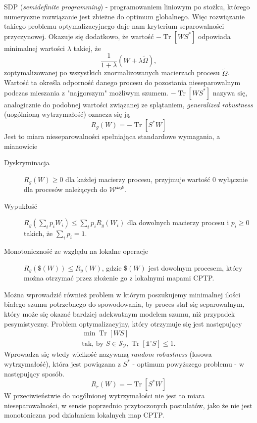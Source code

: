\documentclass[10pt]{article} %
\DeclareMathOperator{\Trs}{Tr}
\newcommand{\IO}{\mathbb{1}^\circ}
\begin{document}
SDP (\textit{semidefinite programming}) - programowaniem liniowym po stożku, którego numeryczne rozwiązanie jest zbieżne do optimum globalnego.
Więc rozwiązanie takiego problemu optymalizacyjnego daje nam kryterium separowalności przyczynowej.
Okazuje się dodatkowo, że wartość $-\Trs \left[ W S^* \right]$ odpowiada minimalnej wartości $\lambda$ takiej, że 
\begin{equation}
\frac{1}{1 + \lambda}\left( W + \lambda\widetilde{\Omega}\right),
\end{equation}
zoptymalizowanej po wszystkich znormalizowanych macierzach procesu $\widetilde{\Omega}$. Wartość ta określa odporność danego procesu do pozostania nieseparowalnym podczas mieszania z "najgorszym" możliwym szumem. $-\Trs \left [ W S^* \right]$ nazywa się, analogicznie do podobnej wartości związanej ze splątaniem, \textit{generalized robustness} (uogólnioną wytrzymałość) oznacza się ją
\begin{equation}
R_g(W) = -\Trs \left[ S^* W \right]
\end{equation} Jest to miara nieseparowalności spełniająca standardowe wymagania, a mianowicie
\begin{description}
\item[Dyskryminacja] $R_g(W) \geq 0$ dla każdej macierzy procesu, przyjmuje wartość 0 wyłącznie dla procesów należących do $\mathcal{W^{sep}}$. 
\item[Wypukłość] $R_g(\sum_i p_i W_i) \leq \sum_i p_i R_g(W_i)$ dla dowolnych macierzy procesu i $p_i \geq 0$ takich, że $\sum_i p_i = 1$. 
\item[Monotoniczność ze względu na lokalne operacje] $R_g\left(\$(W)\right) \leq R_g\left(W\right)$, gdzie $\$(W)$ jest dowolnym procesem, który można 
otrzymać przez złożenie go z lokalnymi mapami CPTP.
\end{description}
Można wprowadzić również problem w którym poszukujemy minimalnej ilości białego szumu potrzebnego do spowodowania, by proces stał się separowalnym, który może się okazać bardziej adekwatnym modelem szumu, niż przypadek pesymistyczny.
Problem optymalizacyjny, który otrzymuje się jest następujący
\begin{gather}
\min \Trs \left[ WS \right]\\
\text{tak, by } S \in \mathcal{S_V}, \Trs\left[\IO S\right] \leq 1.
\end{gather}
Wprowadza się wtedy wielkość nazywaną \textit{random robustness} (losowa wytrzymałość), która jest powiązana z $S^*$ - optimum powyższego problemu - w następujący sposób.
\begin{equation}
R_r(W) = -\Trs\left[S^* W\right]
\end{equation}
W przeciwieństwie do uogólnionej wytrzymałości nie jest to miara nieseparowalności, w sensie poprzednio przytoczonych postulatów, jako że nie jest monotoniczna pod działaniem lokalnych map CPTP.
\end{document}
